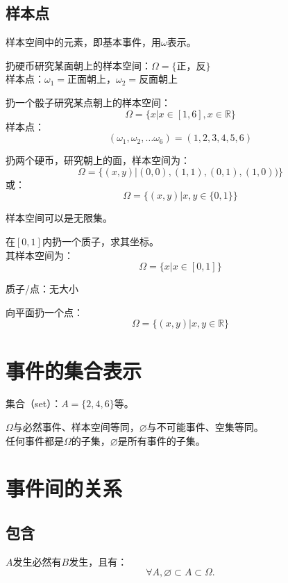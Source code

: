 \subsection{样本点}%
\label{sub:样本点}
样本空间中的元素，即基本事件，用$\omega$表示。
\begin{eg}
	扔硬币研究某面朝上的样本空间：$\Omega=\{\mbox{正，反}\}$\\
	样本点：$\omega_1=\mbox{正面朝上}$，$\omega_2=\mbox{反面朝上}$
\end{eg}
\begin{eg}
	扔一个骰子研究某点朝上的样本空间：
	$$
	\Omega=\{x|x\in[1,6],x\in\mathbb{R}\}
	$$
	样本点：
	$$
	(\omega_1,\omega_2,\dots\omega_6) = (1,2,3,4,5,6)
	$$
\end{eg}
\begin{eg}
	扔两个硬币，研究朝上的面，样本空间为：
	$$
		\Omega=\{(x,y)|(0,0),(1,1),(0,1),(1,0))\}
	$$
	或：
	$$
		\Omega=\{(x,y)|x,y\in\{0,1\}\}
	$$
\end{eg}
\begin{notation}
	样本空间可以是无限集。
\end{notation}
\begin{eg}
	在$[0,1]$内扔一个质子，求其坐标。\\
	其样本空间为：
	$$
    \Omega=\{x|x\in[0,1]\}
	$$
\end{eg}
\begin{notation}
    质子/点：无大小
\end{notation}
\begin{eg}
	向平面扔一个点：
	$$
		\Omega=\{(x,y)|x,y\in\mathbb{R}\}
	$$
\end{eg}
\section{事件的集合表示}%
\label{sec:事件的集合表示}
集合（set）：$A=\{2,4,6\}$等。
\begin{notation}
	$\Omega$与必然事件、样本空间等同，$\varnothing$与不可能事件、空集等同。\\
	任何事件都是$\Omega$的子集，$\varnothing$是所有事件的子集。
\end{notation}

\section{事件间的关系}
\subsection{包含}%
\label{sub:包含}
\begin{center}
\end{center}
$A$发生必然有$B$发生，且有：
\[
\forall A,\varnothing\subset A\subset \Omega
.\] 
